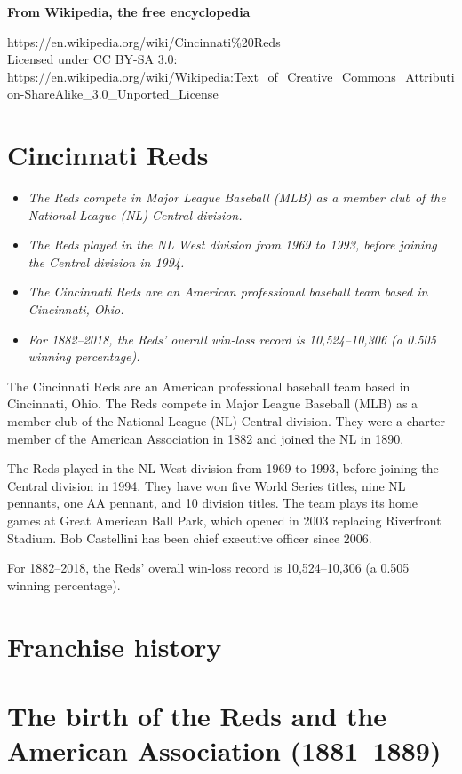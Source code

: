 \textbf{From Wikipedia, the free encyclopedia}

https://en.wikipedia.org/wiki/Cincinnati\%20Reds\\
Licensed under CC BY-SA 3.0:\\
https://en.wikipedia.org/wiki/Wikipedia:Text\_of\_Creative\_Commons\_Attribution-ShareAlike\_3.0\_Unported\_License

\section{Cincinnati Reds}\label{cincinnati-reds}

\begin{itemize}
\item
  \emph{The Reds compete in Major League Baseball (MLB) as a member club
  of the National League (NL) Central division.}
\item
  \emph{The Reds played in the NL West division from 1969 to 1993,
  before joining the Central division in 1994.}
\item
  \emph{The Cincinnati Reds are an American professional baseball team
  based in Cincinnati, Ohio.}
\item
  \emph{For 1882--2018, the Reds' overall win-loss record is
  10,524--10,306 (a 0.505 winning percentage).}
\end{itemize}

The Cincinnati Reds are an American professional baseball team based in
Cincinnati, Ohio. The Reds compete in Major League Baseball (MLB) as a
member club of the National League (NL) Central division. They were a
charter member of the American Association in 1882 and joined the NL in
1890.

The Reds played in the NL West division from 1969 to 1993, before
joining the Central division in 1994. They have won five World Series
titles, nine NL pennants, one AA pennant, and 10 division titles. The
team plays its home games at Great American Ball Park, which opened in
2003 replacing Riverfront Stadium. Bob Castellini has been chief
executive officer since 2006.

For 1882--2018, the Reds' overall win-loss record is 10,524--10,306 (a
0.505 winning percentage).

\section{Franchise history}\label{franchise-history}

\section{The birth of the Reds and the American Association
(1881--1889)}\label{the-birth-of-the-reds-and-the-american-association-18811889}

